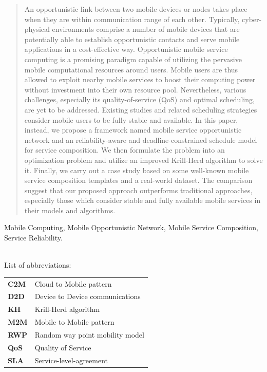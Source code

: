 \documentclass[journal]{IEEEtran}
\begin{document}
\begin{abstract}
An opportunistic link between two mobile devices or nodes takes place when they are within communication range of each other. Typically, cyber-physical environments comprise a number of mobile devices that are potentially able to establish opportunistic contacts and serve mobile applications in a cost-effective way.
Opportunistic mobile service computing is a promising paradigm capable of utilizing the pervasive mobile computational resources around users. Mobile users are thus allowed to exploit nearby mobile services to boost their computing power without investment into their own resource pool. 
Nevertheless, various challenges, especially its quality-of-service (QoS) and optimal scheduling, are yet to be addressed. Existing studies and related scheduling strategies consider mobile users to be fully stable and available.
In this paper, instead, we propose a framework named mobile service opportunistic network and an reliability-aware and deadline-constrained schedule model for service composition. 
We then formulate the problem into an optimization problem and utilize an improved Krill-Herd algorithm to solve it.
Finally, we carry out a case study based on some well-known mobile service composition templates and a real-world dataset. The comparison suggest that our proposed approach outperforms traditional approaches, especially those which consider stable and fully available mobile services  in their models and algorithms.
\end{abstract}

\begin{IEEEkeywords}
Mobile Computing, Mobile Opportunistic Network, Mobile Service Composition, Service Reliability.
\end{IEEEkeywords}

~\\
\noindent List of abbreviations:
~\\

\noindent
\begin{tabular}{@{} l p{7.36cm} }
\textbf{C2M}   &   Cloud to Mobile pattern\\
\textbf{D2D}   &   Device to Device communications \\
\textbf{KH}    &   Krill-Herd algorithm \\
\textbf{M2M}   &   Mobile to Mobile pattern \\
\textbf{RWP}   &   Random way point mobility model \\
\textbf{QoS}   &   Quality of Service \\
\textbf{SLA}   &   Service-level-agreement \\
\end{tabular}
\end{document}

